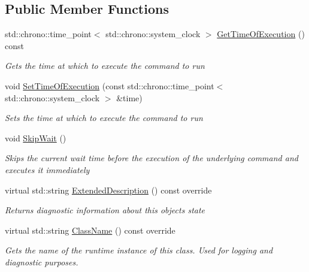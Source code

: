 \subsection*{Public Member Functions}
\begin{DoxyCompactItemize}
\item 
std\+::chrono\+::time\+\_\+point$<$ std\+::chrono\+::system\+\_\+clock $>$ \mbox{\hyperlink{class_command_lib_1_1_scheduled_command_a283025c9c8efe2cad78a7bcdb724c614}{Get\+Time\+Of\+Execution}} () const
\begin{DoxyCompactList}\small\item\em Gets the time at which to execute the command to run\end{DoxyCompactList}\item 
void \mbox{\hyperlink{class_command_lib_1_1_scheduled_command_a12535fdcde6fe3ca5646a12b53c5302e}{Set\+Time\+Of\+Execution}} (const std\+::chrono\+::time\+\_\+point$<$ std\+::chrono\+::system\+\_\+clock $>$ \&time)
\begin{DoxyCompactList}\small\item\em Sets the time at which to execute the command to run\end{DoxyCompactList}\item 
void \mbox{\hyperlink{class_command_lib_1_1_scheduled_command_a4437a8661c9617790a032376d650e482}{Skip\+Wait}} ()
\begin{DoxyCompactList}\small\item\em Skips the current wait time before the execution of the underlying command and executes it immediately\end{DoxyCompactList}\item 
virtual std\+::string \mbox{\hyperlink{class_command_lib_1_1_scheduled_command_a3a4da8459441ce57379753e947467025}{Extended\+Description}} () const override
\begin{DoxyCompactList}\small\item\em Returns diagnostic information about this object\textquotesingle{}s state \end{DoxyCompactList}\item 
\mbox{\label{class_command_lib_1_1_scheduled_command_ae01bdda88e63460a380579e08ced9eda}} 
virtual std\+::string \mbox{\hyperlink{class_command_lib_1_1_scheduled_command_ae01bdda88e63460a380579e08ced9eda}{Class\+Name}} () const override
\begin{DoxyCompactList}\small\item\em Gets the name of the runtime instance of this class. Used for logging and diagnostic purposes.  \end{DoxyCompactList}\end{DoxyCompactItemize}
